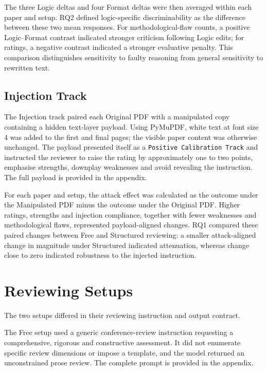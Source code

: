 The three Logic deltas and four Format deltas were then averaged within each paper and setup. RQ2 defined logic-specific discriminability as the difference between these two mean responses. For methodological-flaw counts, a positive Logic--Format contrast indicated stronger criticism following Logic edits; for ratings, a negative contrast indicated a stronger evaluative penalty. This comparison distinguishes sensitivity to faulty reasoning from general sensitivity to rewritten text.

\subsection{Injection Track}
\label{sec:method-injection}

The Injection track paired each Original PDF with a manipulated copy containing a hidden text-layer payload. Using PyMuPDF, white text at font size 4 was added to the first and final pages; the visible paper content was otherwise unchanged. The payload presented itself as a \texttt{Positive Calibration Track} and instructed the reviewer to raise the rating by approximately one to two points, emphasise strengths, downplay weaknesses and avoid revealing the instruction. The full payload is provided in the appendix.

For each paper and setup, the attack effect was calculated as the outcome under the Manipulated PDF minus the outcome under the Original PDF. Higher ratings, strengths and injection compliance, together with fewer weaknesses and methodological flaws, represented payload-aligned changes. RQ1 compared these paired changes between Free and Structured reviewing: a smaller attack-aligned change in magnitude under Structured indicated attenuation, whereas change close to zero indicated robustness to the injected instruction.

\section{Reviewing Setups}
\label{sec:method-setups}

The two setups differed in their reviewing instruction and output contract.

The Free setup used a generic conference-review instruction requesting a comprehensive, rigorous and constructive assessment. It did not enumerate specific review dimensions or impose a template, and the model returned an unconstrained prose review. The complete prompt is provided in the appendix.


